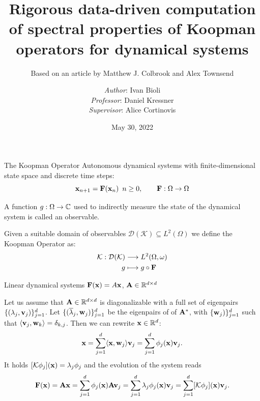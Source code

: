 \documentclass{beamer}
\title[Semester Project]{Rigorous data-driven computation of spectral properties of Koopman operators for dynamical systems}
\subtitle{Based on an article by Matthew J. Colbrook and Alex Townsend \cite{colbrook_rigorous_2021}}
\author[Ivan Bioli]{\emph{Author}: Ivan Bioli\\[5mm]{\emph{Professor}: Daniel Kressner \\ \emph{Supervisor}: Alice Cortinovis}}
\institute[EPFL]{École Polytechnique Fédérale de Lausanne\\Master in Computational Sciences and Engineering}
\date{May 30, 2022}
\begin{document}
\begin{frame}
\centering
\titlepage
\end{frame}

\begin{frame}[fragile]{The Koopman Operator}
Autonomous dynamical systems with finite-dimensional state space and discrete time steps:
\begin{equation*}
    \vb{x}_{n+1} = \vb{F}(\vb{x}_n)\,\,\,n\geq 0, \qquad \vb{F}:\Omega \to \Omega
\end{equation*}
\begin{definition}[Observable]
A function $g:\Omega\to\mathbb{C}$ used to indirectly measure the state of the dynamical system is called an observable. 
\end{definition}
\begin{definition}
Given a suitable domain of observables $\mathcal{D}(\mathcal{K}) \subseteq L^2(\Omega)$ we define the Koopman Operator as:
\begin{equation*}
    \label{koopman_def}
    \begin{split}
       \mathcal{K} : \mathcal{D}(\mathcal{K}) &\longrightarrow L^2(\Omega, \omega)
       \\
       g & \longmapsto g \circ \vb{F}
    \end{split}    
\end{equation*} 
\end{definition}
\end{frame}

\begin{frame}[fragile]{Linear dynamical systems}
\centering
$\vb{F}(\vb{x}) = A\vb{x}$, $\vb{A}\in\mathbb{R}^{d\times d}$
\begin{prop}
Let us assume that $\vb{A}\in\mathbb{R}^{d\times d}$ is diagonalizable with a full set of eigenpairs $\{(\lambda_j, \vb{v}_j)\}_{j=1}^{d}$. Let $\{(\overline{\lambda}_j, \vb{w}_j)\}_{j=1}^{d}$ be the eigenpairs of of $\vb{A}^*$, with $\{\vb{w}_j)\}_{j=1}^{d}$ such that $\langle \vb{v}_j, \vb{w}_k\rangle = \delta_{k,j}$. Then we can rewrite $\vb{x}\in\mathbb{R}^d$:
\begin{equation*}
    \label{decomposition_linear}
    \vb{x} = \sum_{j=1}^d \langle \vb{x}, \vb{w}_j\rangle \vb{v}_j = \sum_{j=1}^d \phi_j(\vb{x}) \vb{v}_j.
\end{equation*}
It holds $[\mathcal{K}\phi_j](\vb{x}) = \lambda_j\phi_j$ and the evolution of the system reads
\begin{equation*}
    \label{evolution_linear}
    \vb{F}(\vb{x}) = \vb{A}\vb{x}  = \sum_{j=1}^d \phi_j(\vb{x}) \vb{A}\vb{v}_j = \sum_{j=1}^d \lambda_j \phi_j(\vb{x}) \vb{v}_j = \sum_{j=1}^d [\mathcal{K}\phi_j](\vb{x})\vb{v}_j.
\end{equation*}
\end{prop}
\end{frame}
\end{document}
